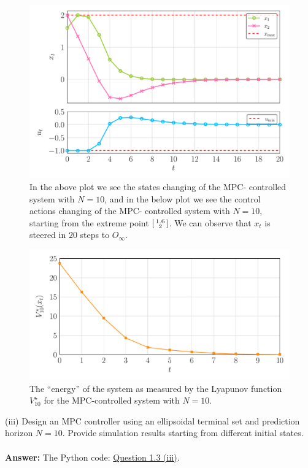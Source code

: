 \documentclass[a4paper,11pt,reqno]{amsart}
\begin{document}
\begin{figure}[H]
    \centering
    \vspace{-0.35cm}
    \includegraphics[width=0.7\linewidth]{figures/q3_ii_xt_ut.pdf}
    \caption{In the above plot we see the states changing of the MPC-
    controlled system with $N = 10$, and in the below plot we see the control actions changing of the MPC-
    controlled system with $N = 10$, starting from the extreme point $\begin{bsmallmatrix}1.6\\2\end{bsmallmatrix}$. 
    We can observe that $x_t$ is steered in $20$ steps to $O_{\infty}$.}
    \label{fig:q3_ii_xt_ut}
\end{figure}
\begin{figure}[H]
    \centering
    \vspace{-0.35cm}
    \includegraphics[width=0.7\linewidth]{figures/q3_ii_cost.pdf}
    \caption{The ``energy'' of the system as measured by the Lyapunov function $V^{\star}_{10}$ for the MPC-controlled system with $N = 10$.}
    \label{fig:q3_ii_cost}
\end{figure}
(iii) Design an MPC controller using an ellipsoidal terminal set and prediction horizon $N=10$. Provide simulation results starting from different initial states.
\\ \\
\textbf{Answer:} 
The Python code: \href{https://github.com/Gczmy/ELE8088/blob/main/Coursework1/Python_code/3_iii.py}{Question 1.3 (iii)}.
\end{document}
